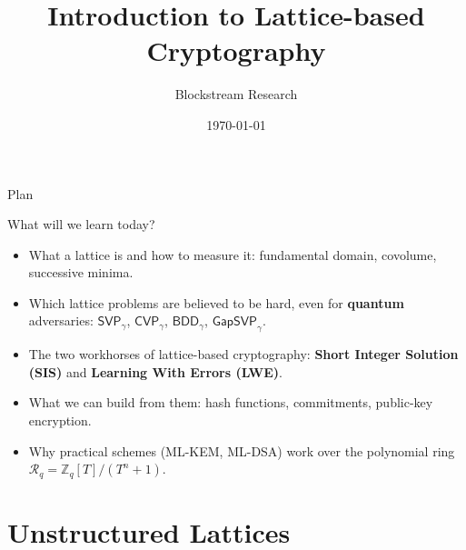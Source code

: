 \documentclass{zkdl-presentation-template}
\title[Lattices]{\textbf{Introduction to Lattice-based Cryptography}}
\author{Blockstream Research}
\date{\today}
\begin{document}
    \maketitleframe

    \begin{frame}{Plan}
      \tableofcontents[hideallsubsections]
    \end{frame}

    \begin{frame}{What will we learn today?}
        \begin{itemize}
            \item What a lattice is and how to measure it: fundamental domain, covolume, successive minima.\pause
            \item Which lattice problems are believed to be hard, even for \textbf{quantum} adversaries: $\mathsf{SVP}_{\gamma}$, $\mathsf{CVP}_{\gamma}$, $\mathsf{BDD}_{\gamma}$, $\mathsf{GapSVP}_{\gamma}$.\pause
            \item The two workhorses of lattice-based cryptography: \textbf{Short Integer Solution (SIS)} and \textbf{Learning With Errors (LWE)}.\pause
            \item What we can build from them: hash functions, commitments, public-key encryption.\pause
            \item Why practical schemes (ML-KEM, ML-DSA) work over the polynomial ring $\mathcal{R}_q = \mathbb{Z}_q[T]/(T^n+1)$.
        \end{itemize}
    \end{frame}

    \section{Unstructured Lattices}
\end{document}
